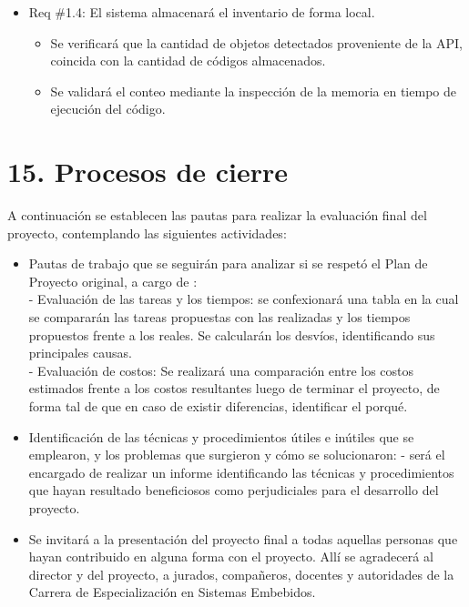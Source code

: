 \documentclass[
11pt, %
codirector, %
]{charter}
\begin{document}
\begin{itemize}
\item Req \#1.4: El sistema almacenará el inventario de forma local.

\begin{itemize}
	\item Se verificará que la cantidad de objetos detectados proveniente de la API, coincida con la cantidad de códigos almacenados.
	\item Se validará el conteo mediante la inspección de la memoria en tiempo de ejecución del código.
\end{itemize}



\end{itemize}


\section{15. Procesos de cierre}    
\label{sec:cierre}

A continuación se establecen las pautas para realizar la evaluación final del proyecto, contemplando las siguientes actividades:

\begin{itemize}
	\item Pautas de trabajo que se seguirán para analizar si se respetó el Plan de Proyecto original, a cargo de \authorname:\\
	 - Evaluación de las tareas y los tiempos: se confexionará una tabla en la cual se compararán las tareas propuestas con las realizadas y los tiempos propuestos frente a los reales. Se calcularán los desvíos, identificando sus principales causas.\\
  - Evaluación de costos: Se realizará una comparación entre los costos estimados frente a los costos resultantes luego de terminar el proyecto, de forma tal de que en caso de existir diferencias, identificar el porqué.
	\item Identificación de las técnicas y procedimientos útiles e inútiles que se emplearon, y los problemas que surgieron y cómo se solucionaron:
	 - \authorname será el encargado de realizar  un informe identificando las técnicas y procedimientos que hayan resultado beneficiosos como perjudiciales para el desarrollo del proyecto.
	\item Se invitará a la presentación del proyecto final a todas aquellas personas que hayan contribuido en alguna forma con el  proyecto. Allí se agradecerá al director y del proyecto, a jurados, compañeros, docentes y autoridades de la Carrera de Especialización en Sistemas Embebidos.
\end{itemize}
\end{document}
